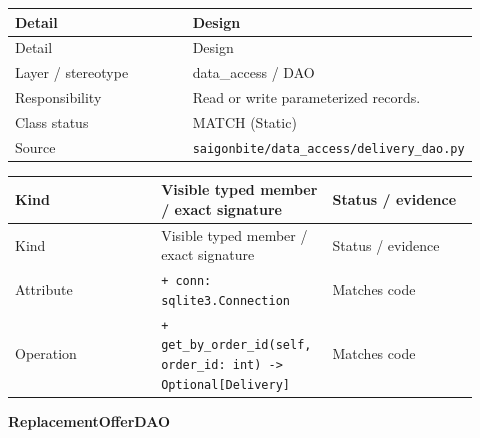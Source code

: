\begin{longtable}{>{\raggedright\arraybackslash}p{0.4600\linewidth}>{\raggedright\arraybackslash}p{0.4600\linewidth}}
Detail & Design \\
\hline\endfirsthead
Detail & Design \\
\hline\endhead
Layer / stereotype & data\_access / \guillemotleft{}DAO\guillemotright{} \\
Responsibility & Read or write parameterized records. \\
Class status & MATCH (Static) \\
Source & \texttt{saigonbite/\allowbreak{}data\_\allowbreak{}access/\allowbreak{}delivery\_\allowbreak{}dao.\allowbreak{}py} \\
\end{longtable}
\begin{longtable}{>{\raggedright\arraybackslash}p{0.3067\linewidth}>{\raggedright\arraybackslash}p{0.3067\linewidth}>{\raggedright\arraybackslash}p{0.3067\linewidth}}
Kind & Visible typed member / exact signature & Status / evidence \\
\hline\endfirsthead
Kind & Visible typed member / exact signature & Status / evidence \\
\hline\endhead
Attribute & \texttt{+ conn: sqlite3.\allowbreak{}Connection} & Matches code \\
Operation & \texttt{+ get\_\allowbreak{}by\_\allowbreak{}order\_\allowbreak{}id(self, order\_\allowbreak{}id: int) -\textgreater{} Optional[Delivery]} & Matches code \\
\end{longtable}
\textbf{ReplacementOfferDAO}

